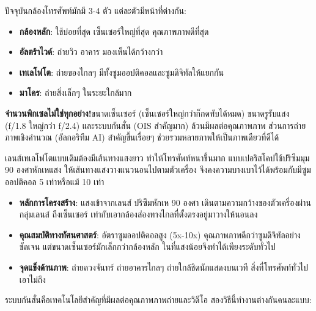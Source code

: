 
ปัจจุบันกล้องโทรศัพท์มักมี 3-4 ตัว แต่ละตัวมีหน้าที่ต่างกัน:

\begin{itemize}
  \item \textbf{กล้องหลัก}: ใช้บ่อยที่สุด เซ็นเซอร์ใหญ่ที่สุด คุณภาพภาพดีที่สุด
  \item \textbf{อัลตร้าไวด์}: ถ่ายวิว อาคาร มองเห็นได้กว้างกว่า
  \item \textbf{เทเลโฟโต}: ถ่ายของไกลๆ มีทั้งซูมออปติคอลและซูมดิจิทัลให้แยกกัน
  \item \textbf{มาโคร}: ถ่ายสิ่งเล็กๆ ในระยะใกล้มาก
\end{itemize}

\textbf{จำนวนพิกเซลไม่ใช่ทุกอย่าง!}ขนาดเซ็นเซอร์ (เซ็นเซอร์ใหญ่กว่าก็กดทับได้หมด) ขนาดรูรับแสง (f/1.8 ใหญ่กว่า f/2.4) และระบบกันสั่น (OIS สำคัญมาก) ล้วนมีผลต่อคุณภาพภาพ ส่วนการถ่ายภาพเชิงคำนวณ (อัลกอริทึม AI) สำคัญขึ้นเรื่อยๆ ช่วยรวมหลายภาพให้เป็นภาพเดียวที่ดีได้


เลนส์เทเลโฟโตแบบเดิมต้องมีเส้นทางแสงยาว ทำให้โทรศัพท์หนาขึ้นมาก แบบเปอริสโคปใช้ปริซึมมุม 90 องศาหักเหแสง ให้เส้นทางแสงวางแนวนอนไปตามตัวเครื่อง จึงคงความบางเบาไว้ได้พร้อมกับมีซูมออปติคอล 5 เท่าหรือแม้ 10 เท่า

\begin{itemize}
  \item \textbf{หลักการโครงสร้าง}: แสงเข้าจากเลนส์ ปริซึมหักเห 90 องศา เดินตามความกว้างของตัวเครื่องผ่านกลุ่มเลนส์ ถึงเซ็นเซอร์ เท่ากับเอากล้องส่องทางไกลที่ตั้งตรงอยู่มาวางให้นอนลง
  \item \textbf{คุณสมบัติทางทัศนศาสตร์}: อัตราซูมออปติคอลสูง (5x-10x) คุณภาพภาพดีกว่าซูมดิจิทัลอย่างชัดเจน แต่ขนาดเซ็นเซอร์มักเล็กกว่ากล้องหลัก ในที่แสงน้อยจึงทำได้เพียงระดับทั่วไป
  \item \textbf{จุดแข็งด้านภาพ}: ถ่ายดวงจันทร์ ถ่ายอาคารไกลๆ ถ่ายใกล้ชิดนักแสดงบนเวที สิ่งที่โทรศัพท์ทั่วไปเอาไม่ถึง
\end{itemize}


ระบบกันสั่นคือเทคโนโลยีสำคัญที่มีผลต่อคุณภาพภาพถ่ายและวิดีโอ สองวิธีนี้ทำงานต่างกันคนละแบบ:

